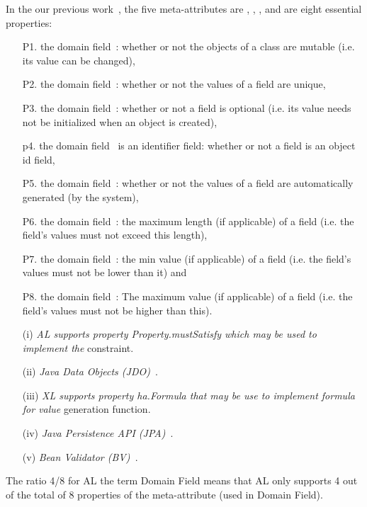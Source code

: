 In the our previous work~\cite{le_domain_2018}, the five meta-attributes are , , ,  and  are eight  essential properties: 
\begin{enumerate}
	\item[P1.] the domain field~: whether or not the objects of a class are mutable  (i.e. its value can be changed),
	\item[P2.] the domain field~: whether or not the values of a field are unique,
	\item[P3.] the domain field~: whether or not a field is optional (i.e. its value needs not be initialized when an object is created),
	\item[p4.] the domain field~ is an identifier field: whether or not a field is an object id field,
	\item[P5.] the domain field~: whether or not the values of a field are automatically generated (by the system),
	\item[P6.] the domain field~: the maximum length (if applicable) of a field (i.e. the field’s values must not exceed this length),
	\item[P7.] the domain field~:  the min value (if applicable) of a field (i.e. the field’s values must not be lower than it) and
	\item[P8.] the domain field~:  The maximum value (if applicable) of a field (i.e. the field’s values must not be higher than this).
		
\end{enumerate}
\begin{enumerate}
	 
	\item [(i)]\textit{AL supports property Property.mustSatisfy which may be used to implement the}
constraint.
	\item [(ii)]\textit{Java Data Objects (JDO)~\cite{JDO_Annotations_Reference2021}}.
	\item [(iii)]\textit{XL supports property ha.Formula that may be use to implement formula for value}
generation function.
	\item [(iv)]\textit{Java Persistence API (JPA)~\cite{Java_Persistence_API2013}}.
	\item [(v)]\textit{ Bean Validator (BV)~\cite{Jakarta_Bean_Validation}}.

\end{enumerate}
The ratio 4/8 for AL \wrt the term Domain Field means that AL only supports 4 out of the total of 8 properties of the meta-attribute  (used in Domain Field). 


